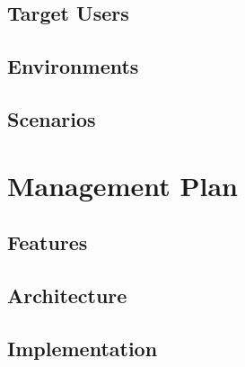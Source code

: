 \documentclass[11pt]{article}
\begin{document}
\subsection{Target Users}


\subsection{Environments}


\subsection{Scenarios}


%
\section{Management Plan}\label{management-plan}

\subsection{Features}


\subsection{Architecture}


\subsection{Implementation}
\end{document}
